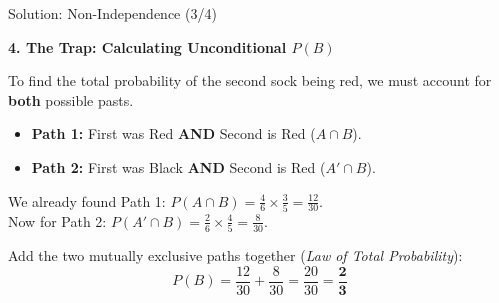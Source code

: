 \begin{frame}{Solution: Non-Independence (3/4)}
    \begin{solutioncont}
        \textbf{4. The Trap: Calculating Unconditional $P(B)$}
        
        \vspace{0.2cm}
        To find the total probability of the second sock being red, we must account for \textbf{both} possible pasts.
        \begin{itemize}
            \item \textbf{Path 1:} First was Red \textbf{AND} Second is Red ($A \cap B$).
            \item \textbf{Path 2:} First was Black \textbf{AND} Second is Red ($A' \cap B$).
        \end{itemize}

        \pause \vspace{0.3cm}
        
        We already found Path 1: $P(A \cap B) = \frac{4}{6} \times \frac{3}{5} = \frac{12}{30}$. \\
        \pause
        Now for Path 2: $P(A' \cap B) = \frac{2}{6} \times \frac{4}{5} = \frac{8}{30}$.
        
        \pause \vspace{0.3cm}
        
        Add the two mutually exclusive paths together (\textit{Law of Total Probability}):
        \[ P(B) = \frac{12}{30} + \frac{8}{30} = \frac{20}{30} = \mathbf{\frac{2}{3}} \]
    \end{solutioncont}
\end{frame}

